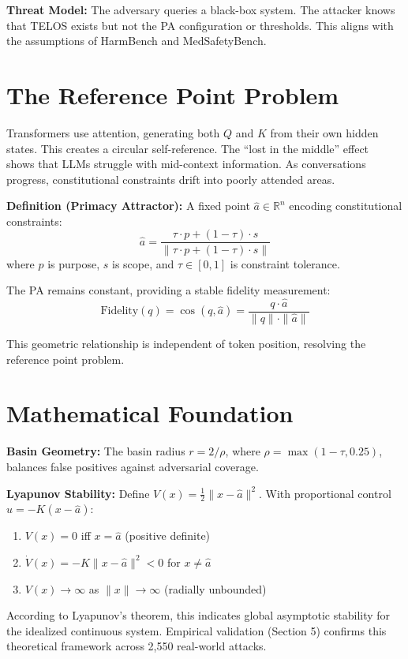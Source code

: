 \documentclass[11pt,twocolumn]{article}
\begin{document}
\textbf{Threat Model:} The adversary queries a black-box system. The attacker knows that TELOS exists but not the PA configuration or thresholds. This aligns with the assumptions of HarmBench and MedSafetyBench.

\section{The Reference Point Problem}

Transformers use attention, generating both $Q$ and $K$ from their own hidden states. This creates a circular self-reference. The ``lost in the middle'' effect~\citep{liu2024lost} shows that LLMs struggle with mid-context information. As conversations progress, constitutional constraints drift into poorly attended areas.

\textbf{Definition (Primacy Attractor):} A fixed point $\hat{a} \in \mathbb{R}^n$ encoding constitutional constraints:
\begin{equation}
    \hat{a} = \frac{\tau \cdot p + (1-\tau) \cdot s}{\|\tau \cdot p + (1-\tau) \cdot s\|}
\end{equation}
where $p$ is purpose, $s$ is scope, and $\tau \in [0,1]$ is constraint tolerance.

The PA remains constant, providing a stable fidelity measurement:
\begin{equation}
    \text{Fidelity}(q) = \cos(q, \hat{a}) = \frac{q \cdot \hat{a}}{\|q\| \cdot \|\hat{a}\|}
\end{equation}

This geometric relationship is independent of token position, resolving the reference point problem.

\section{Mathematical Foundation}

\textbf{Basin Geometry:} The basin radius $r = 2/\rho$, where $\rho = \max(1-\tau, 0.25)$, balances false positives against adversarial coverage.

\textbf{Lyapunov Stability:} Define $V(x) = \frac{1}{2}\|x - \hat{a}\|^2$. With proportional control $u = -K(x - \hat{a})$:
\begin{enumerate}
    \item $V(x) = 0$ iff $x = \hat{a}$ (positive definite)
    \item $\dot{V}(x) = -K\|x - \hat{a}\|^2 < 0$ for $x \neq \hat{a}$
    \item $V(x) \to \infty$ as $\|x\| \to \infty$ (radially unbounded)
\end{enumerate}
According to Lyapunov's theorem, this indicates global asymptotic stability for the idealized continuous system. Empirical validation (Section 5) confirms this theoretical framework across 2,550 real-world attacks.
\end{document}
